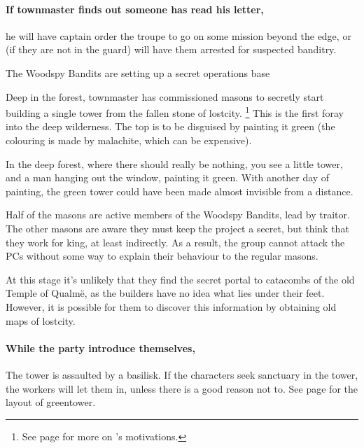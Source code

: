 \begin{multicols}{2}
\paragraph{If \gls{townmaster} finds out someone has read his letter,}
he will have \gls{captain} order the troupe to go on some mission beyond the \gls{edge}, or (if they are not in the \gls{guard}) will have them arrested for suspected banditry.


{}%
{The Woodspy Bandits are setting up a secret operations base}%

Deep in the forest, \gls{townmaster} has commissioned masons to secretly start building a single tower from the fallen stone of \gls{lostcity}.
\footnote{See page \pageref{expanding_wilderness} for more on 's motivations.}
This is the first foray into the deep wilderness.
The top is to be disguised by painting it green (the colouring is made by malachite, which can be expensive).

\begin{boxtext}

  In the deep forest, where there should really be nothing, you see a little tower, and a man hanging out the window, painting it green.
  With another day of painting, the green tower could have been made almost invisible from a distance.

\end{boxtext}

Half of the masons are active members of the Woodspy Bandits, lead by \gls{traitor}.
The other masons are aware they must keep the project a secret, but think that they work for \gls{king}, at least indirectly.
As a result, the group cannot attack the PCs without some way to explain their behaviour to the regular masons.

At this stage it's unlikely that they find the secret portal to catacombs of the old Temple of Qualm\"{e}, as the builders have no idea what lies under their feet.
However, it is possible for them to discover this information by obtaining old maps of \gls{lostcity}.

\paragraph{While the party introduce themselves,}
The tower is assaulted by a basilisk.
If the characters seek sanctuary in the tower, the workers will let them in, unless there is a good reason not to.
See page \pageref{green_tower} for the layout of \gls{greentower}.


\end{multicols}
